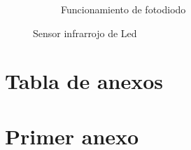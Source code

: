 \documentclass[a4paper,11pt]{report}    %
\begin{document}
\begin{figure}[H]
\begin{subfigure}[t]{0.475\textwidth}
        \caption{Funcionamiento de fotodiodo}
        \label{subfig:example-image-c}
    \end{subfigure}
    \caption{Sensor infrarrojo de Led}
    \label{fig:test_subfigure}
\end{figure}





\begin{appendices}

\chapter*{Tabla de anexos}
\startcontents[chapter]

\chapter{Primer anexo}

\cite{CitekeyBook}



\end{appendices}

\end{document}

